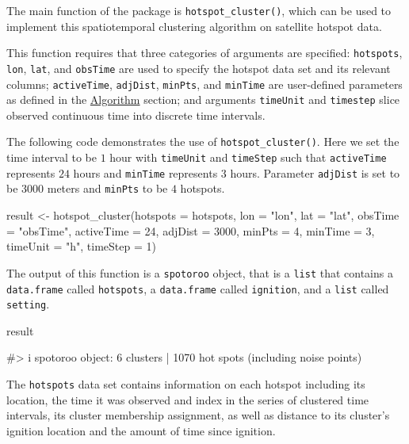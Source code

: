 The main function of the  package is
\texttt{hotspot\_cluster()}, which can be used to implement this
spatiotemporal clustering algorithm on satellite hotspot data.

This function requires that three categories of arguments are specified:
\texttt{hotspots}, \texttt{lon}, \texttt{lat}, and \texttt{obsTime} are
used to specify the hotspot data set and its relevant columns;
\texttt{activeTime}, \texttt{adjDist}, \texttt{minPts}, and
\texttt{minTime} are user-defined parameters as defined in the
\protect\hyperlink{algorithm}{Algorithm} section; and arguments
\texttt{timeUnit} and \texttt{timestep} slice observed continuous time
into discrete time intervals.

The following code demonstrates the use of \texttt{hotspot\_cluster()}.
Here we set the time interval to be \(1\) hour with \texttt{timeUnit}
and \texttt{timeStep} such that \texttt{activeTime} represents \(24\)
hours and \texttt{minTime} represents \(3\) hours. Parameter
\texttt{adjDist} is set to be \(3000\) meters and \texttt{minPts} to be
\(4\) hotspots.

\begin{Schunk}
\begin{Sinput}
result <- hotspot_cluster(hotspots = hotspots,
                          lon = "lon",
                          lat = "lat",
                          obsTime = "obsTime",
                          activeTime = 24,
                          adjDist = 3000,
                          minPts = 4,
                          minTime = 3,
                          timeUnit = "h",
                          timeStep = 1)
\end{Sinput}
\end{Schunk}

The output of this function is a \texttt{spotoroo} object, that is a
\texttt{list} that contains a \texttt{data.frame} called
\texttt{hotspots}, a \texttt{data.frame} called \texttt{ignition}, and a
\texttt{list} called \texttt{setting}.

\begin{Schunk}
\begin{Sinput}
result
\end{Sinput}
\begin{Soutput}
#> i spotoroo object: 6 clusters | 1070 hot spots (including noise points)
\end{Soutput}
\end{Schunk}

The \texttt{hotspots} data set contains information on each hotspot
including its location, the time it was observed and index in the series
of clustered time intervals, its cluster membership assignment, as well
as distance to its cluster's ignition location and the amount of time
since ignition.

